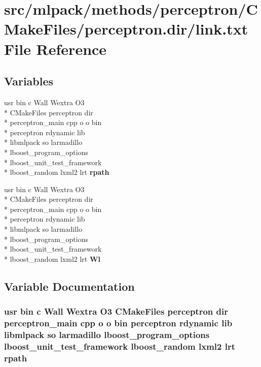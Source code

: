 \section{src/mlpack/methods/perceptron/\-C\-Make\-Files/perceptron.dir/link.txt File Reference}
\label{methods_2perceptron_2CMakeFiles_2perceptron_8dir_2link_8txt}
\subsection*{Variables}
\begin{DoxyCompactItemize}
\item 
usr bin c Wall Wextra O3 \\*
C\-Make\-Files perceptron dir \\*
perceptron\-\_\-main cpp o o bin \\*
perceptron rdynamic lib \\*
libmlpack so larmadillo \\*
lboost\-\_\-program\-\_\-options \\*
lboost\-\_\-unit\-\_\-test\-\_\-framework \\*
lboost\-\_\-random lxml2 lrt {\bf rpath}
\item 
usr bin c Wall Wextra O3 \\*
C\-Make\-Files perceptron dir \\*
perceptron\-\_\-main cpp o o bin \\*
perceptron rdynamic lib \\*
libmlpack so larmadillo \\*
lboost\-\_\-program\-\_\-options \\*
lboost\-\_\-unit\-\_\-test\-\_\-framework \\*
lboost\-\_\-random lxml2 lrt {\bf Wl}
\end{DoxyCompactItemize}


\subsection{Variable Documentation}
\subsubsection[{rpath}]{\setlength{\rightskip}{0pt plus 5cm}usr bin c Wall Wextra O3 C\-Make\-Files perceptron dir perceptron\-\_\-main cpp o o bin perceptron rdynamic lib libmlpack so larmadillo lboost\-\_\-program\-\_\-options lboost\-\_\-unit\-\_\-test\-\_\-framework lboost\-\_\-random lxml2 lrt rpath}\label{methods_2perceptron_2CMakeFiles_2perceptron_8dir_2link_8txt_ada7f8f9607a82b7dee248d56b4e4ed3a}


